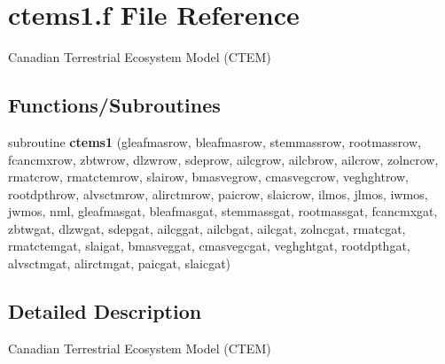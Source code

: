 \hypertarget{ctems1_8f}{}\section{ctems1.\+f File Reference}
\label{ctems1_8f}


Canadian Terrestrial Ecosystem Model (C\+T\+E\+M)  


\subsection*{Functions/\+Subroutines}
\begin{DoxyCompactItemize}
\item 
\hypertarget{ctems1_8f_ac687fbca2d67c053bdf020766a399b40}{}subroutine {\bfseries ctems1} (gleafmasrow, bleafmasrow, stemmassrow, rootmassrow, fcancmxrow, zbtwrow, dlzwrow, sdeprow, ailcgrow, ailcbrow, ailcrow, zolncrow, rmatcrow, rmatctemrow, slairow, bmasvegrow, cmasvegcrow, veghghtrow, rootdpthrow, alvsctmrow, alirctmrow, paicrow, slaicrow, ilmos, jlmos, iwmos, jwmos, nml, gleafmasgat, bleafmasgat, stemmassgat, rootmassgat, fcancmxgat, zbtwgat, dlzwgat, sdepgat, ailcggat, ailcbgat, ailcgat, zolncgat, rmatcgat, rmatctemgat, slaigat, bmasveggat, cmasvegcgat, veghghtgat, rootdpthgat, alvsctmgat, alirctmgat, paicgat, slaicgat)\label{ctems1_8f_ac687fbca2d67c053bdf020766a399b40}

\end{DoxyCompactItemize}


\subsection{Detailed Description}
Canadian Terrestrial Ecosystem Model (C\+T\+E\+M) 

